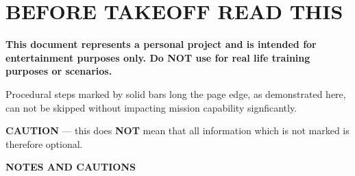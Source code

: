 \tableofcontents
\etocsettocstyle{}{}%

\chapter*{BEFORE TAKEOFF READ THIS}
\thumbnar

\begin{tcolorbox}[
    enhanced, 
    colback=white, 
    colframe=color1, 
    colbacktitle=white, 
    coltitle=color1, 
    sharp corners, 
    attach boxed title to top center={yshift=4mm},
    boxed title style={
        sharp corners,
        drop shadow=color1!100
    }, 
    title=\LARGE\textbf{DISCLAIMER}
]
    \textbf{%
        This document represents a personal project
        and is intended for entertainment purposes only.
        Do NOT use for real life training purposes or scenarios.
    }
\end{tcolorbox}

\bigskip

\begin{multicols}{2}
    
    \medskip

    Procedural steps marked by solid bars long the page edge,
    as demonstrated here, 
    can not be skipped without impacting mission capability signficantly.

    \medskip 

    \textbf{CAUTION} --- this does \textbf{NOT} mean that all information which is not marked is therefore optional.
    \cbend 

    \vfill\null
    \columnbreak

    {\Large\textbf{NOTES AND CAUTIONS}}


\end{multicols}

\cleardoublepage
